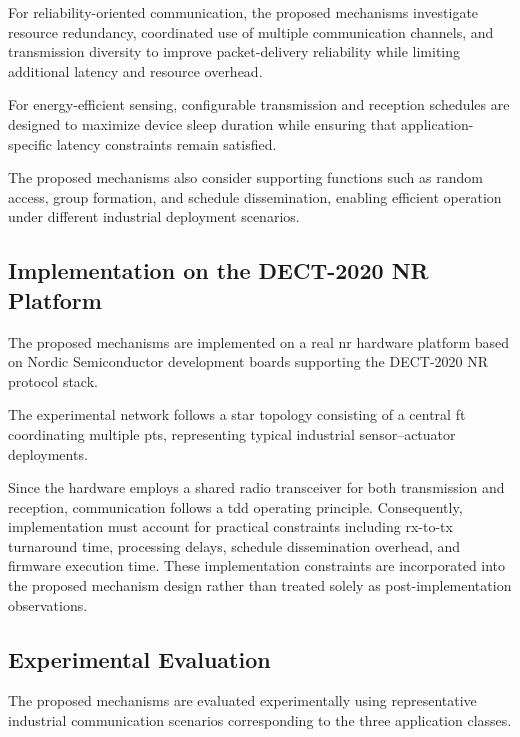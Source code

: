 \documentclass[12pt,a4paper]{article}
\begin{document}
For reliability-oriented communication, the proposed mechanisms investigate resource redundancy, coordinated use of multiple communication channels, and transmission diversity to improve packet-delivery reliability while limiting additional latency and resource overhead.

For energy-efficient sensing, configurable transmission and reception schedules are designed to maximize device sleep duration while ensuring that application-specific latency constraints remain satisfied.

The proposed mechanisms also consider supporting functions such as random access, group formation, and schedule dissemination, enabling efficient operation under different industrial deployment scenarios.


\subsection{Implementation on the DECT-2020 NR Platform}

The proposed mechanisms are implemented on a real \gls{nr} hardware platform based on Nordic Semiconductor development boards supporting the DECT-2020 NR protocol stack.

The experimental network follows a star topology consisting of a central \gls{ft} coordinating multiple \glspl{pt}, representing typical industrial sensor--actuator deployments.

Since the hardware employs a shared radio transceiver for both transmission and reception, communication follows a \gls{tdd} operating principle. Consequently, implementation must account for practical constraints including \gls{rx}-to-\gls{tx} turnaround time, processing delays, schedule dissemination overhead, and firmware execution time. These implementation constraints are incorporated into the proposed mechanism design rather than treated solely as post-implementation observations.


\subsection{Experimental Evaluation}

The proposed mechanisms are evaluated experimentally using representative industrial communication scenarios corresponding to the three application classes.
\end{document}
